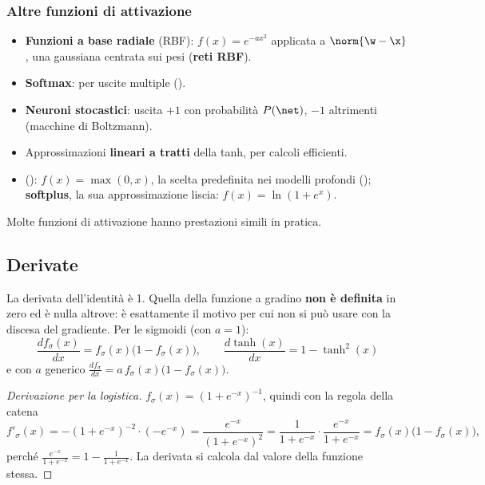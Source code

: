 \subsubsection{Altre funzioni di attivazione}
\begin{itemize}
  \item \textbf{Funzioni a base radiale} (RBF): $f(x) = e^{-ax^2}$ applicata a $\norm{\w-\x}$, una gaussiana
        centrata sui pesi (\textbf{reti RBF}).
  \item \textbf{Softmax}: per uscite multiple ().
  \item \textbf{Neuroni stocastici}: uscita $+1$ con probabilità $P(\net)$, $-1$ altrimenti (macchine di
        Boltzmann).
  \item Approssimazioni \textbf{lineari a tratti} della tanh, per calcoli efficienti.
  \item {} (): $f(x)=\max(0,x)$, la scelta predefinita nei modelli
        profondi (); \textbf{softplus}, la sua approssimazione liscia: $f(x) = \ln(1+e^x)$.
\end{itemize}
Molte funzioni di attivazione hanno prestazioni simili in pratica.

\subsection{Derivate}

La derivata dell'identità è 1. Quella della funzione a gradino \textbf{non è definita} in zero ed è nulla
altrove: è esattamente il motivo per cui non si può usare con la discesa del gradiente. Per le sigmoidi (con
$a=1$):
\begin{equation}\label{eq:derivata-sigmoide}
\boxed{\;\frac{df_\sigma(x)}{dx} = f_\sigma(x)\big(1-f_\sigma(x)\big), \qquad \frac{d\tanh(x)}{dx} = 1-\tanh^2(x)\;}
\end{equation}
e con $a$ generico $\frac{df_\sigma}{dx} = a\,f_\sigma(x)\big(1-f_\sigma(x)\big)$.

\begin{proof}[Derivazione per la logistica]
$f_\sigma(x) = (1+e^{-x})^{-1}$, quindi con la regola della catena
\[
f'_\sigma(x) = -(1+e^{-x})^{-2}\cdot(-e^{-x}) = \frac{e^{-x}}{(1+e^{-x})^2} = \frac{1}{1+e^{-x}}\cdot\frac{e^{-x}}{1+e^{-x}} = f_\sigma(x)\big(1-f_\sigma(x)\big),
\]
perché $\frac{e^{-x}}{1+e^{-x}} = 1-\frac{1}{1+e^{-x}}$. La derivata si calcola dal valore della funzione stessa.
\end{proof}

